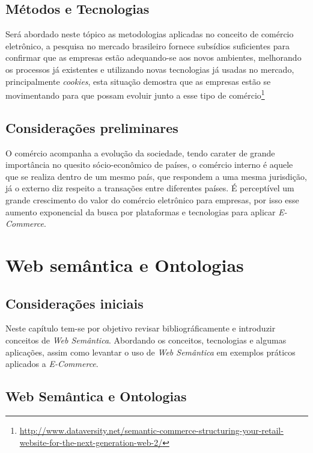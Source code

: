 \section{Métodos e Tecnologias}

Será abordado neste tópico as metodologias aplicadas no conceito de comércio eletrônico, a pesquisa no mercado brasileiro fornece subsídios suficientes para confirmar que as empresas estão adequando-se aos novos ambientes, melhorando os processos já existentes e utilizando novas tecnologias já usadas no mercado, principalmente \textit{cookies}, esta situação demostra que as empresas estão se movimentando para que possam evoluir junto a esse tipo de comércio\footnote{\url{http://www.dataversity.net/semantic-commerce-structuring-your-retail-website-for-the-next-generation-web-2/}}

\section{Considerações preliminares}

O comércio acompanha a evolução da sociedade, tendo carater de grande importância no quesito sócio-econômico de países, o comércio interno é aquele que se realiza dentro de um mesmo país, que respondem a uma mesma jurisdição, já o externo diz respeito a transações entre diferentes países. É perceptível um grande crescimento do valor do comércio eletrônico para empresas, por isso esse aumento exponencial da busca por plataformas e tecnologias para aplicar \textit{E-Commerce}.

\chapter{Web semântica e Ontologias}
\section{Considerações iniciais}

Neste capítulo tem-se por objetivo revisar bibliográficamente e introduzir conceitos de \textit{Web Semântica}. Abordando os conceitos, tecnologias e algumas aplicações, assim como levantar o uso de \textit{Web Semântica} em exemplos práticos aplicados a \textit{E-Commerce}.

\section{Web Semântica e Ontologias}

